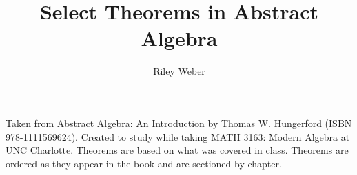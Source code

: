 \documentclass{article}
\theoremstyle{break}
\begin{document}
\title{Select Theorems in Abstract Algebra}
\author{Riley Weber}
\maketitle

Taken from \underline{Abstract Algebra: An Introduction} by Thomas W.
Hungerford (ISBN 978-1111569624). Created to study while taking MATH 3163:
Modern Algebra at UNC Charlotte. Theorems are based on what was covered in
class. Theorems are ordered as they appear in the book and are sectioned by
chapter.
\end{document}
